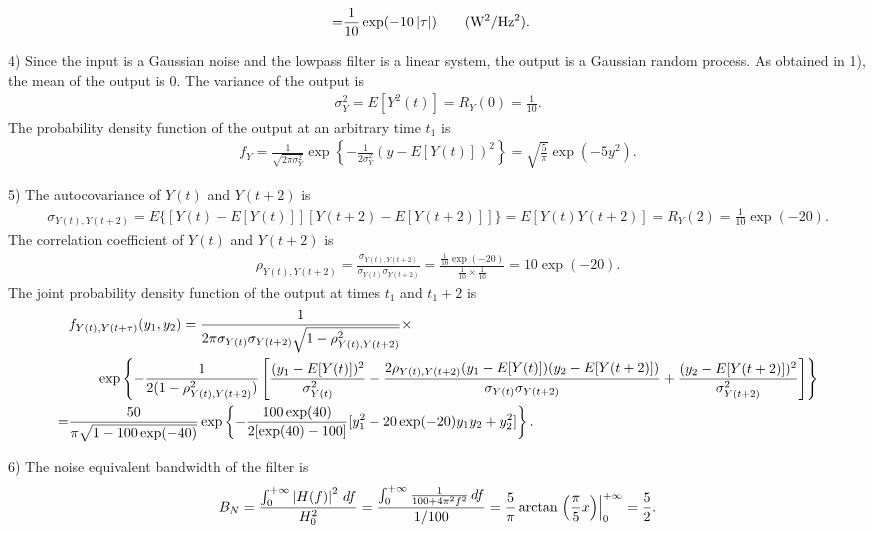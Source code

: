 \documentclass{assignment}
\begin{document}
\begin{sol}
\begin{align}
        =&\frac{1}{10}\exp(-10\left\lvert\tau\right\rvert)\qquad(\text{W$^2$/Hz$^2$}).
    \end{align}
    \item[4)] Since the input is a Gaussian noise and the lowpass filter is a linear system, the output is a Gaussian random process. As obtained in 1), the mean of the output is $0$. The variance of the output is
    \begin{align}
        \sigma_Y^2=E[Y^2(t)]=R_Y(0)=\frac{1}{10}.
    \end{align}
    The probability density function of the output at an arbitrary time $t_1$ is
    \begin{align}
        f_Y=\frac{1}{\sqrt{2\pi\sigma_Y^2}}\exp\left\{-\frac{1}{2\sigma_Y^2}(y-E[Y(t)])^2\right\}=\sqrt{\frac{5}{\pi}}\exp(-5y^2).
    \end{align}
    \item[5)] The autocovariance of $Y(t)$ and $Y(t+2)$ is
    \begin{align}
        \sigma_{Y(t),Y(t+2)}=E\{[Y(t)-E[Y(t)]][Y(t+2)-E[Y(t+2)]]\}=E[Y(t)Y(t+2)]=R_Y(2)=\frac{1}{10}\exp(-20).
    \end{align}
    The correlation coefficient of $Y(t)$ and $Y(t+2)$ is
    \begin{align}
        \rho_{Y(t),Y(t+2)}=\frac{\sigma_{Y(t),Y(t+2)}}{\sigma_{Y(t)}\sigma_{Y(t+2)}}=\frac{\frac{1}{10}\exp(-20)}{\frac{1}{10}\times\frac{1}{10}}=10\exp(-20).
    \end{align}
    The joint probability density function of the output at times $t_1$ and $t_1+2$ is
    \small\begin{align}
        \notag&f_{Y(t),Y(t+\tau)}(y_1,y_2)=\frac{1}{2\pi\sigma_{Y(t)}\sigma_{Y(t+2)}\sqrt{1-\rho_{Y(t),Y(t+2)}^2}}\times\\
        \notag&\qquad\exp\left\{-\frac{1}{2(1-\rho_{Y(t),Y(t+2)}^2)}\left[\frac{(y_1-E[Y(t)])^2}{\sigma_{Y(t)}^2}-\frac{2\rho_{Y(t),Y(t+2)}(y_1-E[Y(t)])(y_2-E[Y(t+2)])}{\sigma_{Y(t)}\sigma_{Y(t+2)}}+\frac{(y_2-E[Y(t+2)])^2}{\sigma_{Y(t+2)}^2}\right]\right\}\\
        =&\frac{50}{\pi\sqrt{1-100\exp(-40)}}\exp\left\{-\frac{100\exp(40)}{2[\exp(40)-100]}[y_1^2-20\exp(-20)y_1y_2+y_2^2]\right\}.
    \end{align}\normalsize
    \item[6)] The noise equivalent bandwidth of the filter is
    \begin{align}
        B_N=\frac{\int_0^{+\infty}\left\lvert H(f)\right\rvert^2\,df}{H_0^2}=\frac{\int_0^{+\infty}\frac{1}{100+4\pi^2f^2}\,df}{1/100}=\frac{5}{\pi}\arctan\left.\left(\frac{\pi}{5}x\right)\right\rvert_0^{+\infty}=\frac{5}{2}.
    \end{align}
\end{sol}
\end{document}
